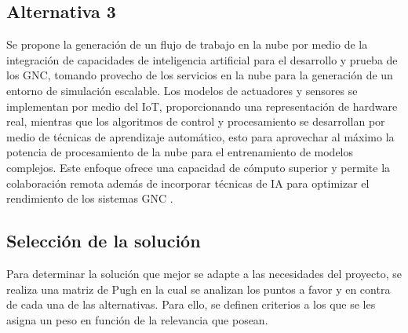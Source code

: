 \documentclass[12pt]{article}
\begin{document}
\subsection{Alternativa 3}
Se propone la generación de un flujo de trabajo en la nube por medio de la integración de capacidades de inteligencia artificial para el desarrollo y prueba de los GNC, tomando provecho de los servicios en la nube para la generación de un entorno de simulación escalable. Los modelos de actuadores y sensores se implementan por medio del IoT, proporcionando una representación de hardware real, mientras que los algoritmos de control y procesamiento se desarrollan por medio de técnicas de aprendizaje automático, esto para aprovechar al máximo la potencia de procesamiento de la nube para el entrenamiento de modelos complejos. Este enfoque ofrece una capacidad de cómputo superior y permite la colaboración remota además de incorporar técnicas de IA para optimizar el rendimiento de los sistemas GNC \cite{wang2022deep} \cite{bitlmal2024guidance}.

\newpage

\subsection{Selección de la solución}

Para determinar la solución que mejor se adapte a las necesidades del proyecto, se realiza una matriz de Pugh en la cual se analizan los puntos a favor y en contra de cada una de las alternativas. Para ello, se definen criterios a los que se les asigna un peso en función de la relevancia que posean.
\end{document}
